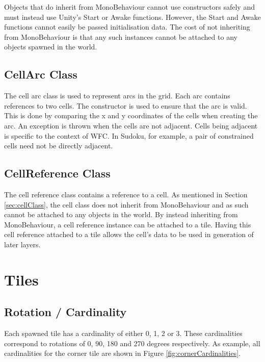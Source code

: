 Objects that do inherit from MonoBehaviour cannot use constructors safely and must instead use Unity's Start or Awake functions. However, the Start and Awake functions cannot easily be passed initialisation data. The cost of not inheriting from MonoBehaviour is that any such instances cannot be attached to any objects spawned in the world.

\subsection{CellArc Class}
The cell arc class is used to represent arcs in the grid. Each arc contains references to two cells. The constructor is used to ensure that the arc is valid. This is done by comparing the x and y coordinates of the cells when creating the arc. An exception is thrown when the cells are not adjacent. Cells being adjacent is specific to the context of WFC. In Sudoku, for example, a pair of constrained cells need not be directly adjacent.


\subsection{CellReference Class}\label{sec:cellReferenceClass}
The cell reference class contains a reference to a cell. As mentioned in Section \ref{sec:cellClass}, the cell class does not inherit from MonoBehaviour and as such cannot be attached to any objects in the world. By instead inheriting from MonoBehaviour, a cell reference instance can be attached to a tile. Having this cell reference attached to a tile allows the cell's data to be used in generation of later layers.


\section{Tiles}
\subsection{Rotation / Cardinality}
Each spawned tile has a cardinality of either 0, 1, 2 or 3. These cardinalities correspond to rotations of 0, 90, 180 and 270 degrees respectively. As example, all cardinalities for the corner tile are shown in Figure \ref{fig:cornerCardinalities}.

